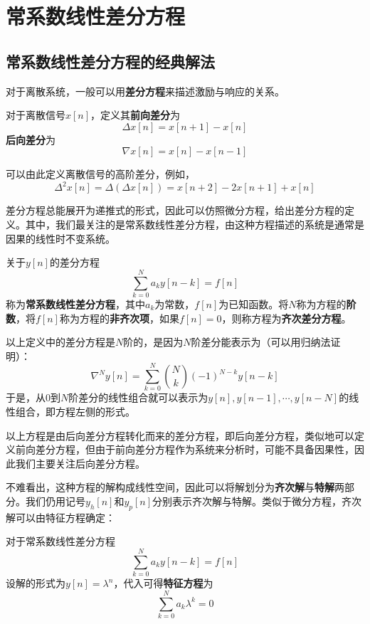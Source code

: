 \section{常系数线性差分方程}

\subsection{常系数线性差分方程的经典解法}\label{sub:difference_equation}

对于离散系统，一般可以用\textbf{差分方程}来描述激励与响应的关系。

\begin{definition}[差分]
    对于离散信号$x[n]$，定义其\textbf{前向差分}为
    $$\Delta x[n]=x[n+1]-x[n]$$
    \textbf{后向差分}为
    $$\nabla x[n]=x[n]-x[n-1]$$
\end{definition}

可以由此定义离散信号的高阶差分，例如，
$$\Delta^2 x[n]=\Delta(\Delta x[n])=x[n+2]-2x[n+1]+x[n]$$

差分方程总能展开为递推式的形式，因此可以仿照微分方程，给出差分方程的定义。其中，我们最关注的是常系数线性差分方程，由这种方程描述的系统是通常是因果的线性时不变系统。
\begin{definition}[常系数线性差分方程]
    关于$y[n]$的差分方程
    $$\sum_{k=0}^{N}a_k y[n-k] = f[n]$$
    称为\textbf{常系数线性差分方程}，其中$a_k$为常数，$f[n]$为已知函数。将$N$称为方程的\textbf{阶数}，将$f[n]$称为方程的\textbf{非齐次项}，如果$f[n]=0$，则称方程为\textbf{齐次差分方程}。
\end{definition}

以上定义中的差分方程是$N$阶的，是因为$N$阶差分能表示为（可以用归纳法证明）：
$$\nabla^N y[n]=\sum_{k=0}^{N}\binom{N}{k}(-1)^{N-k}y[n-k]$$
于是，从$0$到$N$阶差分的线性组合就可以表示为$y[n],y[n-1],\cdots,y[n-N]$的线性组合，即方程左侧的形式。

以上方程是由后向差分方程转化而来的差分方程，即后向差分方程，类似地可以定义前向差分方程，但由于前向差分方程作为系统来分析时，可能不具备因果性，因此我们主要关注后向差分方程。

不难看出，这种方程的解构成线性空间，因此可以将解划分为\textbf{齐次解}与\textbf{特解}两部分。我们仍用记号$y_h[n]$和$y_p[n]$分别表示齐次解与特解。类似于微分方程，齐次解可以由特征方程确定：
\begin{definition}[常系数线性差分方程的特征方程]
    对于常系数线性差分方程
    $$\sum_{k=0}^{N}a_k y[n-k] = f[n]$$
    设解的形式为$y[n]=\lambda^n$，代入可得\textbf{特征方程}为
    $$\sum_{k=0}^{N}a_k \lambda^k = 0$$
\end{definition}

